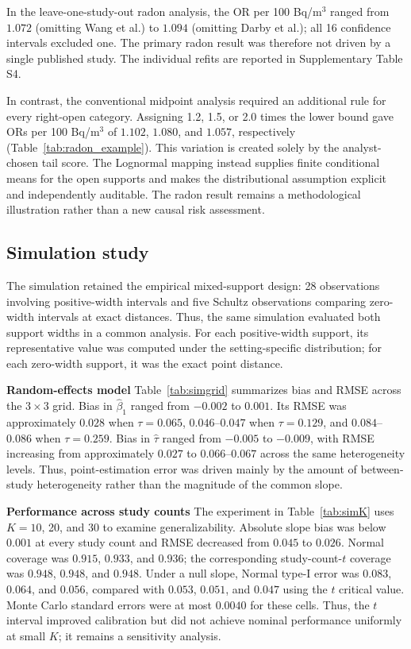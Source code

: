 \documentclass[journal=rsm]{CUP-JNL-DTM}%
\theoremstyle{definition}
\numberwithin{equation}{section}
\begin{document}
In the leave-one-study-out radon analysis, the OR per 100 Bq/m$^3$ ranged from
$1.072$ (omitting Wang et al.) to $1.094$ (omitting Darby et al.); all 16
confidence intervals excluded one. The primary radon result was therefore not
driven by a single published study.
The individual refits are reported in Supplementary Table S4.

In contrast, the conventional midpoint analysis required an additional rule
for every right-open category. Assigning 1.2, 1.5, or 2.0 times the lower bound
gave ORs per 100 Bq/m$^3$ of $1.102$, $1.080$, and $1.057$, respectively
(Table~\ref{tab:radon_example}). This variation is created solely by the
analyst-chosen tail score. The Lognormal mapping instead supplies finite
conditional means for the open supports and makes the distributional
assumption explicit and independently auditable. The radon result remains a
methodological illustration rather than a new causal risk assessment.


\subsection{Simulation study}

The simulation retained the empirical mixed-support design: 28 observations
involving positive-width intervals and five Schultz observations comparing
zero-width intervals at exact distances. Thus, the same simulation evaluated
both support widths in a common analysis. For each positive-width support, its
representative value was computed under the setting-specific distribution; for
each zero-width support, it was the exact point distance.

\noindent\textbf{Random-effects model}
Table~\ref{tab:simgrid} summarizes bias and RMSE across the $3\times3$
grid. Bias in $\hat\beta_1$ ranged from $-0.002$ to $0.001$. Its RMSE was
approximately $0.028$ when $\tau=0.065$, $0.046$--$0.047$ when $\tau=0.129$,
and $0.084$--$0.086$ when $\tau=0.259$. Bias in $\hat\tau$ ranged from
$-0.005$ to $-0.009$, with RMSE increasing from approximately $0.027$ to
$0.066$--$0.067$ across the same heterogeneity levels. Thus, point-estimation error was
driven mainly by the amount of between-study heterogeneity rather than the
magnitude of the common slope.

\noindent\textbf{Performance across study counts}
The experiment in Table~\ref{tab:simK} uses $K=10$, 20, and 30 to examine
generalizability. Absolute slope bias was below $0.001$ at every study count and
RMSE decreased from $0.045$ to $0.026$. Normal coverage was $0.915$, $0.933$,
and $0.936$; the corresponding study-count-$t$ coverage was $0.948$, $0.948$,
and $0.948$. Under a null slope, Normal type-I error was $0.083$, $0.064$, and
$0.056$, compared with $0.053$, $0.051$, and $0.047$ using the $t$ critical
value. Monte Carlo standard errors were at most $0.0040$ for these
cells. Thus, the $t$ interval improved calibration but did not achieve nominal
performance uniformly at small $K$; it remains a sensitivity analysis.
\end{document}

